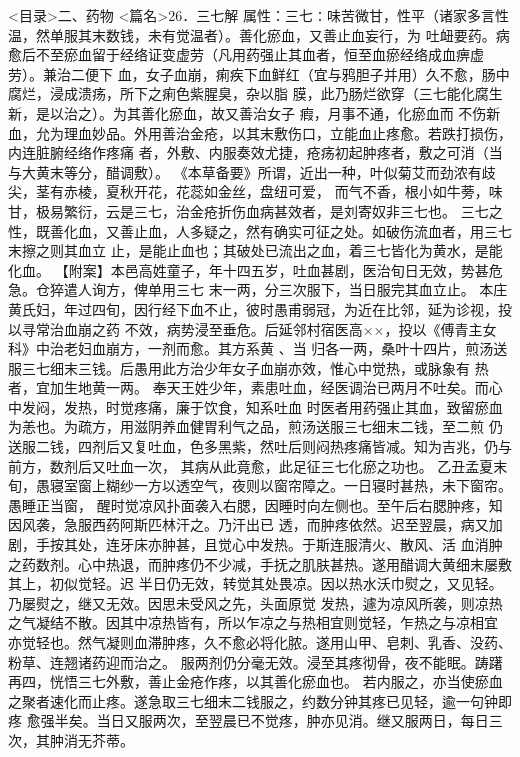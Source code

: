 \documentclass[a4paper,12pt,UTF8,twoside]{ctexbook}
\begin{document}
<目录>二、药物
<篇名>26．三七解
属性：三七∶味苦微甘，性平（诸家多言性温，然单服其末数钱，未有觉温者）。善化瘀血，又善止血妄行，为 
吐衄要药。病愈后不至瘀血留于经络证变虚劳（凡用药强止其血者，恒至血瘀经络成血痹虚劳）。兼治二便下 
血，女子血崩，痢疾下血鲜红（宜与鸦胆子并用）久不愈，肠中腐烂，浸成溃疡，所下之痢色紫腥臭，杂以脂 
膜，此乃肠烂欲穿（三七能化腐生新，是以治之）。为其善化瘀血，故又善治女子 瘕，月事不通，化瘀血而 
不伤新血，允为理血妙品。外用善治金疮，以其末敷伤口，立能血止疼愈。若跌打损伤，内连脏腑经络作疼痛 
者，外敷、内服奏效尤捷，疮疡初起肿疼者，敷之可消（当与大黄末等分，醋调敷）。 
《本草备要》所谓，近出一种，叶似菊艾而劲浓有歧尖，茎有赤棱，夏秋开花，花蕊如金丝，盘纽可爱， 
而气不香，根小如牛蒡，味甘，极易繁衍，云是三七，治金疮折伤血病甚效者，是刘寄奴非三七也。 
三七之性，既善化血，又善止血，人多疑之，然有确实可征之处。如破伤流血者，用三七末擦之则其血立 
止，是能止血也；其破处已流出之血，着三七皆化为黄水，是能化血。 
【附案】本邑高姓童子，年十四五岁，吐血甚剧，医治旬日无效，势甚危急。仓猝遣人询方，俾单用三七 
末一两，分三次服下，当日服完其血立止。 
本庄黄氏妇，年过四旬，因行经下血不止，彼时愚甫弱冠，为近在比邻，延为诊视，投以寻常治血崩之药 
不效，病势浸至垂危。后延邻村宿医高××，投以《傅青主女科》中治老妇血崩方，一剂而愈。其方系黄 、当 
归各一两，桑叶十四片，煎汤送服三七细末三钱。后愚用此方治少年女子血崩亦效，惟心中觉热，或脉象有 
热者，宜加生地黄一两。 
奉天王姓少年，素患吐血，经医调治已两月不吐矣。而心中发闷，发热，时觉疼痛，廉于饮食，知系吐血 
时医者用药强止其血，致留瘀血为恙也。为疏方，用滋阴养血健胃利气之品，煎汤送服三七细末二钱，至二煎 
仍送服二钱，四剂后又复吐血，色多黑紫，然吐后则闷热疼痛皆减。知为吉兆，仍与前方，数剂后又吐血一次， 
其病从此竟愈，此足征三七化瘀之功也。 
乙丑孟夏末旬，愚寝室窗上糊纱一方以透空气，夜则以窗帘障之。一日寝时甚热，未下窗帘。愚睡正当窗， 
醒时觉凉风扑面袭入右腮，因睡时向左侧也。至午后右腮肿疼，知因风袭，急服西药阿斯匹林汗之。乃汗出已 
透，而肿疼依然。迟至翌晨，病又加剧，手按其处，连牙床亦肿甚，且觉心中发热。于斯连服清火、散风、活 
血消肿之药数剂。心中热退，而肿疼仍不少减，手抚之肌肤甚热。遂用醋调大黄细末屡敷其上，初似觉轻。迟 
半日仍无效，转觉其处畏凉。因以热水沃巾熨之，又见轻。乃屡熨之，继又无效。因思未受风之先，头面原觉 
发热，遽为凉风所袭，则凉热之气凝结不散。因其中凉热皆有，所以乍凉之与热相宜则觉轻，乍热之与凉相宜 
亦觉轻也。然气凝则血滞肿疼，久不愈必将化脓。遂用山甲、皂刺、乳香、没药、粉草、连翘诸药迎而治之。 
服两剂仍分毫无效。浸至其疼彻骨，夜不能眠。踌躇再四，恍悟三七外敷，善止金疮作疼，以其善化瘀血也。 
若内服之，亦当使瘀血之聚者速化而止疼。遂急取三七细末二钱服之，约数分钟其疼已见轻，逾一句钟即疼 
愈强半矣。当日又服两次，至翌晨已不觉疼，肿亦见消。继又服两日，每日三次，其肿消无芥蒂。 
\end{document}
